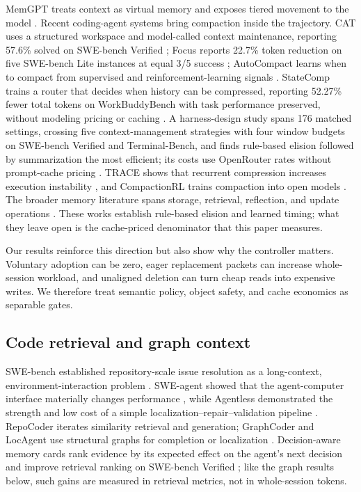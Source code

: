 \documentclass[10pt,twocolumn]{article}
\begin{document}
MemGPT treats context as virtual memory and exposes tiered movement to the model
\cite{packer2023memgpt}.  Recent coding-agent systems bring compaction inside the trajectory.  CAT
uses a structured workspace and model-called context maintenance, reporting 57.6\% solved on
SWE-bench Verified \cite{liu2026cat}; Focus reports 22.7\% token reduction on five SWE-bench Lite
instances at equal 3/5 success \cite{verma2026focus}; AutoCompact learns when to compact from
supervised and reinforcement-learning signals \cite{zhang2026autocompact}.  StateComp trains a router
that decides when history can be compressed, reporting 52.27\% fewer total tokens on WorkBuddyBench
with task performance preserved, without modeling pricing or caching \cite{wang2026statecomp}.  A
harness-design study spans 176 matched settings, crossing five context-management strategies with four
window budgets on SWE-bench Verified and Terminal-Bench, and finds rule-based elision followed by
summarization the most efficient; its costs use OpenRouter rates without prompt-cache pricing
\cite{fan2026harness}.  TRACE shows that recurrent compression increases execution instability
\cite{min2026trace}, and CompactionRL trains compaction into open models \cite{li2026compactionrl}.  The broader memory literature spans storage, retrieval, reflection, and update
operations \cite{zhang2025memorysurvey}.  These works establish rule-based elision and learned timing;
what they leave open is the cache-priced denominator that this paper measures.

Our results reinforce this direction but also show why the controller matters.  Voluntary adoption
can be zero, eager replacement packets can increase whole-session workload, and unaligned deletion can
turn cheap reads into expensive writes.  We therefore treat semantic policy, object safety, and cache
economics as separable gates.

\subsection{Code retrieval and graph context}

SWE-bench established repository-scale issue resolution as a long-context, environment-interaction
problem \cite{jimenez2024swebench}.  SWE-agent showed that the agent-computer interface materially
changes performance \cite{yang2024sweagent}, while Agentless demonstrated the strength and low cost of
a simple localization--repair--validation pipeline \cite{xia2025agentless}.  RepoCoder iterates
similarity retrieval and generation; GraphCoder and LocAgent use structural graphs for completion or
localization \cite{zhang2023repocoder,liu2024graphcoder,chen2025locagent}.  Decision-aware memory
cards rank evidence by its expected effect on the agent's next decision and improve retrieval ranking
on SWE-bench Verified \cite{guan2026memorycards}; like the graph results below, such gains are measured
in retrieval metrics, not in whole-session tokens.
\end{document}
